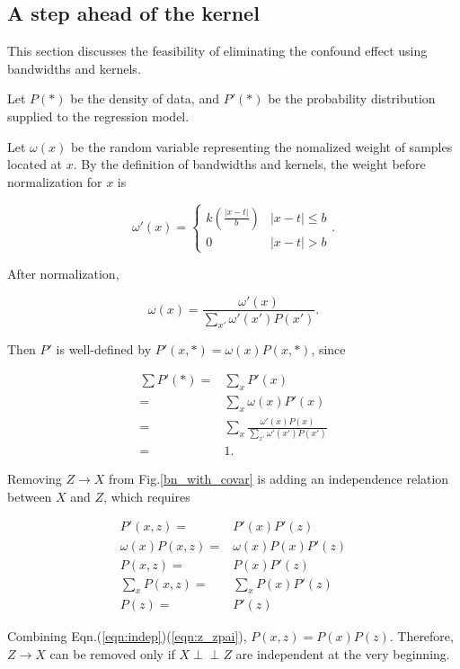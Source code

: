 \documentclass[a4 paper,12pt]{article}
\newcommand{\indep}{\perp \!\!\! \perp}
\begin{document}
\subsection{A step ahead of the kernel}

This section discusses the feasibility of eliminating the confound effect using bandwidths and kernels.

Let $P(*)$ be the density of data,
and $P'(*)$ be the probability distribution supplied to the regression model.

Let $\omega(x)$ be the random variable representing the nomalized weight of samples located at $x$.
By the definition of bandwidths and kernels,
the weight before normalization for $x$ is

\begin{equation}
   \omega'(x)=\begin{cases}
      k\left(\frac{\left|x-t\right|}{b}\right)&\left|x-t\right|\le b\\
      0&\left|x-t\right|>b
   \end{cases}.
\end{equation}

After normalization,

\begin{equation}
   \omega(x)=\frac{\omega'(x)}{\sum_{x'}\omega'(x')P(x')}.
\end{equation}

Then $P'$ is well-defined by $P'(x,*)=\omega(x)P(x,*)$, since

\begin{align}
   \sum P'(*)=&\sum_xP'(x)\\
   =&\sum_x\omega(x)P'(x)\\
   =&\sum_x\frac{\omega'(x)P(x)}{\sum_{x'}\omega'(x')P(x')}\\
   =&1.
\end{align}

Removing $Z\to X$ from Fig.\ref{bn_with_covar} is adding an independence relation between $X$ and $Z$,
which requires

\begin{align}
   P'(x,z)=&P'(x)P'(z)\\
   \omega(x)P(x,z)=&\omega(x)P(x)P'(z)\\
   P(x,z)=&P(x)P'(z)\label{eqn:indep}\\
   \sum_x P(x,z)=&\sum_xP(x)P'(z)\\
   P(z)=&P'(z)\label{eqn:z_zpai}
\end{align}

Combining Eqn.(\ref{eqn:indep})(\ref{eqn:z_zpai}), $P(x,z)=P(x)P(z)$.
Therefore, $Z\to X$ can be removed only if $X\indep Z$ are independent at the very beginning.
\end{document}

